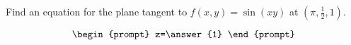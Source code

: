 \documentclass{ximera}
\author{David Guichard \and Neal Koblitz \and H. Jerome Keisler \and Albert Scheller \and Barry Balof \and Mike Wills \and Matthew Carr}
\begin{document}
\begin{exercise}




Find an equation for the plane tangent to $f(x,y)=\sin(xy)$ at $(\pi,\frac{1}{2},1)$.

\[
\begin{prompt}
z=\answer{1}
\end{prompt}
\]

\end{exercise}
\end{document}
